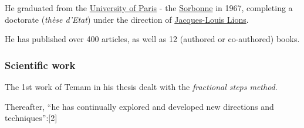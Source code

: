 \documentclass{article}
\begin{document}
He graduated from the \href{https://en.wikipedia.org/wiki/University_of_Paris}{University of Paris} - the \href{https://en.wikipedia.org/wiki/Sorbonne}{Sorbonne} in 1967, completing a doctorate (\textit{thèse d'Etat}) under the direction of \href{https://en.wikipedia.org/wiki/Jacques-Louis_Lions}{Jacques-Louis Lions}.

He has published over 400 articles, as well as 12 (authored or co-authored) books.

\subsubsection{Scientific work}
The 1st work of Temam in his thesis dealt with the \textit{fractional steps method}.

Thereafter, ``he has continually explored and developed new directions and techniques'':[2]
\end{document}

